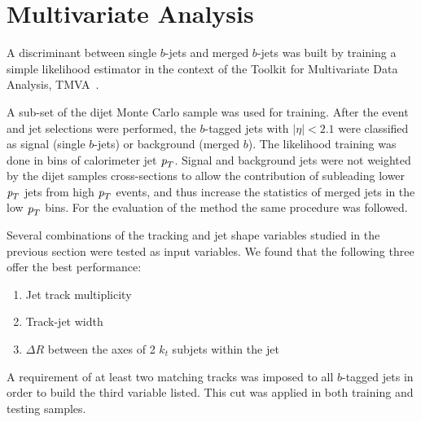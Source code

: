 \chapter{Multivariate Analysis}\label{sec:gbbTMVA}




A discriminant between single $b$-jets and merged $b$-jets was built by training a simple likelihood estimator in the context of the Toolkit for Multivariate Data Analysis, TMVA~\cite{Hocker:2007ht}.

A sub-set of the dijet Monte Carlo sample was used for training. After the event and jet selections were performed, the $b$-tagged jets with $|\eta| < 2.1$ were classified as signal (single $b$-jets) or background (merged $b$). %
The likelihood training was done in bins of calorimeter jet ${\emph{p}_{T}}$. %
Signal and background jets were not weighted by the dijet samples cross-sections to allow the contribution of subleading lower ${\emph{p}_{T}}$ jets from high ${\emph{p}_{T}}$ events, and thus increase the statistics of merged jets in the low ${\emph{p}_{T}}$ bins. For the evaluation of the method the same procedure was followed.

Several combinations of the tracking and jet shape variables studied in the previous section were tested as input variables. We found that the following three offer the best performance:
\begin{enumerate}\addtolength{\itemsep}{-0.4\baselineskip}
\item
Jet track multiplicity
\item
Track-jet width
\item
$\Delta R$ between the axes of 2 $k_t$ subjets within the jet
\end{enumerate}
%
A requirement of at least two matching tracks was imposed to all $b$-tagged jets in order to build the third variable listed. This cut was applied in both training and testing samples.

